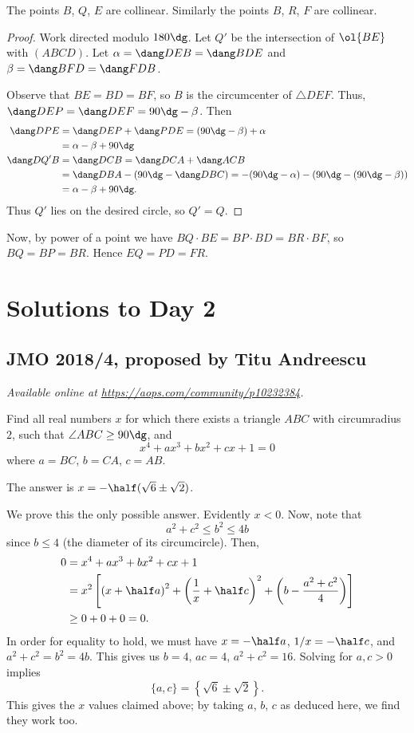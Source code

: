 \documentclass[11pt]{scrartcl}
\begin{document}
\begin{claim*}
  The points $B$, $Q$, $E$ are collinear.
  Similarly the points $B$, $R$, $F$ are collinear.
\end{claim*}
\begin{proof}
  Work directed modulo $180\dg$.
  Let $Q'$ be the intersection of $\ol{BE}$ with $(ABCD)$.
  Let $\alpha = \dang DEB = \dang BDE$
  and $\beta = \dang BFD = \dang FDB$.

  Observe that $BE = BD = BF$, so $B$ is the circumcenter
  of $\triangle DEF$. Thus, $\dang DEP = \dang DEF = 90\dg - \beta$.
  Then
  \begin{align*}
    \dang DPE &= \dang DEP + \dang PDE = (90\dg-\beta) + \alpha \\
    &= \alpha - \beta + 90\dg \\
    \dang DQ'B &= \dang DCB = \dang DCA + \dang ACB \\
    &= \dang DBA - (90\dg - \dang DBC) = -(90\dg-\alpha) - (90\dg - (90\dg - \beta)) \\
    &= \alpha - \beta + 90\dg.
  \end{align*}
  Thus $Q'$ lies on the desired circle, so $Q' = Q$.
\end{proof}

Now, by power of a point we have $BQ \cdot BE = BP \cdot BD = BR \cdot BF$,
so $BQ = BP = BR$. Hence $EQ = PD = FR$.
\pagebreak

\section{Solutions to Day 2}
\subsection{JMO 2018/4, proposed by Titu Andreescu}
\textsl{Available online at \url{https://aops.com/community/p10232384}.}
\begin{mdframed}[style=mdpurplebox,frametitle={Problem statement}]
Find all real numbers $x$ for which
there exists a triangle $ABC$ with circumradius $2$,
such that $\angle ABC \ge 90\dg$, and
\[ x^4 + ax^3 + bx^2 + cx + 1 = 0 \]
where $a = BC$, $b = CA$, $c = AB$.
\end{mdframed}
The answer is $x = -\half (\sqrt6 \pm \sqrt 2)$.

We prove this the only possible answer.
Evidently $x < 0$.
Now, note that
\[ a^2+c^2 \le b^2 \le 4b \]
since $b \le 4$ (the diameter of its circumcircle).
Then,
\begin{align*}
  0 &= x^4 + ax^3 + bx^2 + cx + 1 \\
  &= x^2 \left[ \left( x + \half a \right)^2
    + \left( \frac1x + \half c \right)^2
    + \left( b - \frac{a^2+c^2}{4} \right) \right] \\
  &\ge 0+0+0 = 0.
\end{align*}
In order for equality to hold,
we must have $x = -\half a$, $1/x = -\half c$,
and $a^2+c^2 = b^2 = 4b$.
This gives us $b = 4$, $ac = 4$, $a^2+c^2=16$.
Solving for $a,c > 0$ implies
\[ \{a,c\} = \left\{ \sqrt6 \pm \sqrt 2 \right\}.  \]
This gives the $x$ values claimed above;
by taking $a$, $b$, $c$ as deduced here,
we find they work too.
\end{document}
